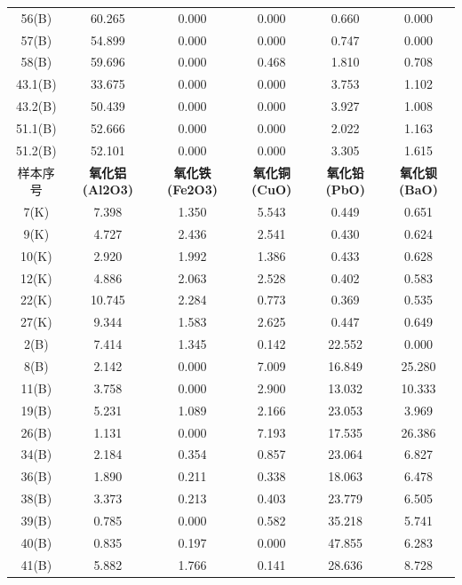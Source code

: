 \documentclass{my_paper}
\begin{document}
\begin{enumerate}
\begin{longtable}{c|ccccc}
    56(B)   & 60.265 & 0.000 & 0.000  & 0.660  & 0.000  \\
    57(B)   & 54.899 & 0.000 & 0.000  & 0.747  & 0.000  \\
    58(B)   & 59.696 & 0.000 & 0.468  & 1.810  & 0.708  \\
    43.1(B) & 33.675 & 0.000 & 0.000  & 3.753  & 1.102  \\
    43.2(B) & 50.439 & 0.000 & 0.000  & 3.927  & 1.008  \\
    51.1(B) & 52.666 & 0.000 & 0.000  & 2.022  & 1.163  \\
    51.2(B) & 52.101 & 0.000 & 0.000  & 3.305  & 1.615  \\\midrule
  样本序号                 & \multicolumn{1}{c}{\textbf{氧化铝(Al2O3)}}  & \multicolumn{1}{c}{\textbf{氧化铁(Fe2O3)}} & \multicolumn{1}{c}{\textbf{氧化铜(CuO)}}  & \multicolumn{1}{c}{\textbf{氧化铅(PbO)}}  & \multicolumn{1}{c}{\textbf{氧化钡(BaO)}} \\\midrule
  7(K)    & 7.398  & 1.350 & 5.543  & 0.449  & 0.651  \\
9(K)    & 4.727  & 2.436 & 2.541  & 0.430  & 0.624  \\
10(K)   & 2.920  & 1.992 & 1.386  & 0.433  & 0.628  \\
12(K)   & 4.886  & 2.063 & 2.528  & 0.402  & 0.583  \\
22(K)   & 10.745 & 2.284 & 0.773  & 0.369  & 0.535  \\
27(K)   & 9.344  & 1.583 & 2.625  & 0.447  & 0.649  \\
2(B)    & 7.414  & 1.345 & 0.142  & 22.552 & 0.000  \\
8(B)    & 2.142  & 0.000 & 7.009  & 16.849 & 25.280 \\
11(B)   & 3.758  & 0.000 & 2.900  & 13.032 & 10.333 \\
19(B)   & 5.231  & 1.089 & 2.166  & 23.053 & 3.969  \\
26(B)   & 1.131  & 0.000 & 7.193  & 17.535 & 26.386 \\
34(B)   & 2.184  & 0.354 & 0.857  & 23.064 & 6.827  \\
36(B)   & 1.890  & 0.211 & 0.338  & 18.063 & 6.478  \\
38(B)   & 3.373  & 0.213 & 0.403  & 23.779 & 6.505  \\
39(B)   & 0.785  & 0.000 & 0.582  & 35.218 & 5.741  \\
40(B)   & 0.835  & 0.197 & 0.000  & 47.855 & 6.283  \\
41(B)   & 5.882  & 1.766 & 0.141  & 28.636 & 8.728  \\

\end{longtable}
\end{enumerate}
\end{document}
